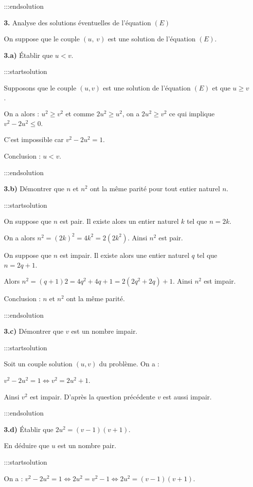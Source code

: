 \documentclass[12pt]{cornouaille}
\begin{document}
:::endsolution



\textbf{3. } Analyse des solutions éventuelles de l'équation $(E)$

On suppose que le couple $(u,~v)$ est une solution de l'équation $(E)$.




\textbf{3.a) } Établir que $u < v$.


:::startsolution

Supposons que le couple $(u,v)$ est une solution de l'équation $(E)$ et que $u\geqslant v$.

On a alors :  $u^2 \geqslant v^2$ et comme $2u^2 \geqslant u^2$, on a $2u^2 \geqslant v^2$ ce qui implique $v^2-2u^2\leqslant 0$.

C'est impossible car $v^2-2u^2=1$.

Conclusion : $u < v$.


:::endsolution


\textbf{3.b) }  Démontrer que $n$ et $n^2$ ont la même parité pour tout entier naturel $n$.


:::startsolution

On suppose que $n$ est pair. Il existe alors un entier naturel $k$
tel que $n=2k$.

On a alors $n^2=(2k)^2=4k^2=2(2k^2)$. Ainsi $n^2$ est pair.

On suppose que $n$ est impair. Il existe alors une entier naturel $q$ tel
que $n=2q+1$.

Alors $n^2=(q+1)2=4q^2+4q+1=2(2q^2+2q)+1$. Ainsi  $n^2$ est impair.


Conclusion : $n$ et $n^2$ ont la même parité.


:::endsolution



\textbf{3.c) }  Démontrer que $v$ est un nombre impair.


:::startsolution

Soit un couple solution $(u,v)$ du problème. On a  :

$v^2-2u^2=1 \iff v^2=2u^2+1$.

Ainsi $v^2$ est impair. D'après la question précédente $v$ est aussi impair.


:::endsolution


\textbf{3.d) }  Établir que $2u^2 =(v-1)(v+1)$.

En déduire que $u$ est un nombre pair.


:::startsolution

On a : $v^2-2u^2=1 \iff 2u^2=v^2-1 \iff 2u^2=(v-1)(v+1)$.
\end{document}
